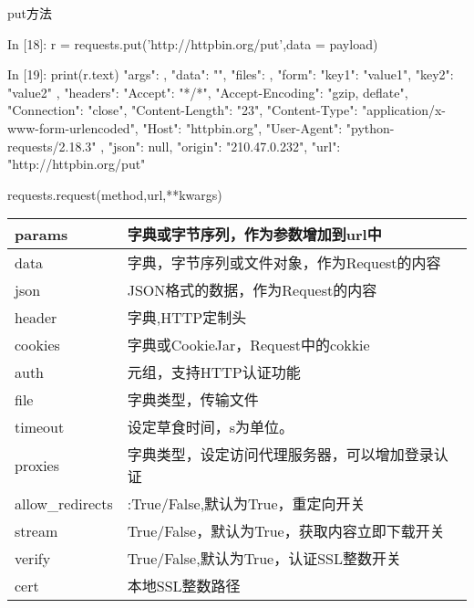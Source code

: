put方法
\begin{python}
In [18]: r = requests.put('http://httpbin.org/put',data = payload)

In [19]: print(r.text)
{
  "args": {}, 
  "data": "", 
  "files": {}, 
  "form": {
    "key1": "value1", 
    "key2": "value2"
  }, 
  "headers": {
    "Accept": "*/*", 
    "Accept-Encoding": "gzip, deflate", 
    "Connection": "close", 
    "Content-Length": "23", 
    "Content-Type": "application/x-www-form-urlencoded", 
    "Host": "httpbin.org", 
    "User-Agent": "python-requests/2.18.3"
  }, 
  "json": null, 
  "origin": "210.47.0.232", 
  "url": "http://httpbin.org/put"
}
\end{python}
requests.request(method,url,**kwargs)\newline
{}
\begin{tabular}{|p{3cm}|p{12cm}|}
\hline
params&字典或字节序列，作为参数增加到url中\\
\hline
data&字典，字节序列或文件对象，作为Request的内容\\
\hline
json&JSON格式的数据，作为Request的内容\\
\hline
header&字典,HTTP定制头\\
\hline
cookies&字典或CookieJar，Request中的cokkie\\
\hline
auth&元组，支持HTTP认证功能\\
\hline
file&字典类型，传输文件\\
\hline
timeout&设定草食时间，s为单位。\\
\hline
proxies&字典类型，设定访问代理服务器，可以增加登录认证\\
\hline
allow\_redirects&:True/False,默认为True，重定向开关\\
\hline
stream&True/False，默认为True，获取内容立即下载开关\\
\hline
verify&True/False,默认为True，认证SSL整数开关\\
\hline
cert&本地SSL整数路径\\
\hline
\end{tabular}

